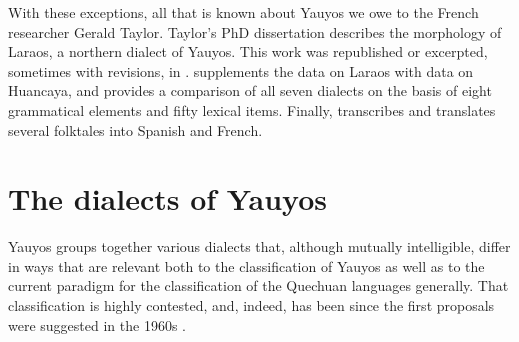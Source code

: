 With these exceptions, all that is known about Yauyos we owe to the French researcher Gerald Taylor. Taylor’s PhD dissertation describes the morphology of Laraos, a northern dialect of Yauyos. This work was republished or excerpted, sometimes with revisions, in \citet{Taylor84,Taylor90,Taylor94a,Taylor94b}. \citet{Taylor87a} supplements the data on Laraos with data on Huancaya, and
\citet{Taylor90,Taylor00} provides a comparison of all seven dialects on the basis of eight grammatical elements and fifty lexical items. Finally, \citet{Taylor87b,Taylor87c,Taylor91} transcribes and translates several folktales into Spanish and French.


\section{The dialects of Yauyos}\label{sec:dialectsofyauyos}
Yauyos groups together various dialects that, although mutually intelligible, differ in ways that are relevant both to the classification of Yauyos as well as to the current paradigm for the classification of the Quechuan languages generally. That classification is highly contested, and, indeed, has been since the first proposals were suggested in the 1960s \citep[See in particular][]{Landerman91}.


